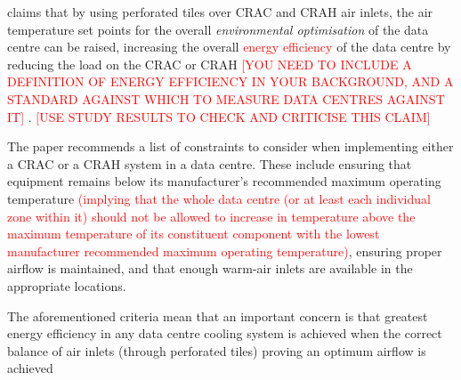 \cite{ SeeberAndSeeberImprovingDataCenterEnergyEfficiencyThroughEnvironmentalOptimization} claims that by using perforated tiles over \gls{CRAC} and \gls{CRAH} air inlets, the air temperature set points for the overall \emph{environmental optimisation} of the data centre can be raised, increasing the overall \textcolor{red}{energy efficiency} of the data centre by reducing the load on the \gls{CRAC} or \gls{CRAH} \textcolor{red}{[YOU NEED TO INCLUDE A DEFINITION OF ENERGY EFFICIENCY IN YOUR BACKGROUND, AND A STANDARD AGAINST WHICH TO MEASURE DATA CENTRES AGAINST IT]} \cite[abstract]{ SeeberAndSeeberImprovingDataCenterEnergyEfficiencyThroughEnvironmentalOptimization}. \textcolor{red}{[USE STUDY RESULTS TO CHECK AND CRITICISE THIS CLAIM]}

The paper recommends a list of constraints to consider when implementing either a \gls{CRAC} or a \gls{CRAH} system in a \gls{data centre}. These include  ensuring that equipment remains below its manufacturer's recommended maximum operating temperature \textcolor{red}{(implying that the whole \gls{data centre} (or at least each individual zone within it) should not be allowed to increase in temperature above the maximum temperature of its constituent component with the lowest manufacturer recommended maximum operating temperature)}, ensuring proper airflow is maintained, and that enough warm-air inlets are available in the appropriate locations.

The aforementioned criteria mean that an important concern is that greatest energy efficiency in any \gls{data centre} cooling system is achieved when the correct balance of air inlets (through perforated tiles) proving an optimum airflow is achieved \cite[Optimizing Air Temperature Set Points and Air Flows Can Shrink PUE Numbers]{SeeberAndSeeberImprovingDataCenterEnergyEfficiencyThroughEnvironmentalOptimization}

